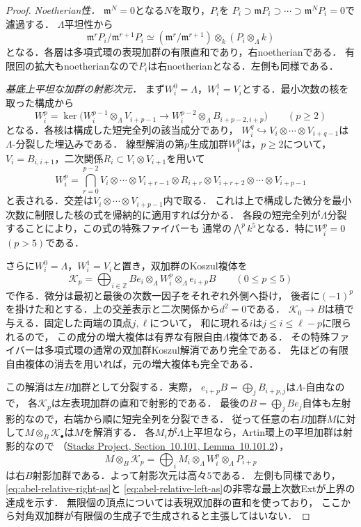 \begin{proof}
\emph{Noetherian性．}
$\mathfrak m^N=0$となる$N$を取り，$P_i$を
$P_i\supset\mathfrak mP_i\supset\cdots\supset\mathfrak m^NP_i=0$で濾過する．
$\Lambda$平坦性から
\[
 \mathfrak m^rP_i/\mathfrak m^{r+1}P_i
  \simeq (\mathfrak m^r/\mathfrak m^{r+1})
       \otimes_k(P_i\otimes_\Lambda k)
\]
となる．各層は多項式環の表現加群の有限直和であり，右noetherianである．
有限回の拡大もnoetherianなので$P_i$は右noetherianとなる．左側も同様である．

\emph{基底上平坦な加群の射影次元．}
まず$W_i^0=\Lambda$，$W_i^1=V_i$とする．最小次数の核を取った構成から
\[
 W_i^p=\ker\bigl(W_i^{p-1}\otimes_\Lambda V_{i+p-1}
       \longrightarrow W_i^{p-2}\otimes_\Lambda B_{i+p-2,i+p}\bigr)
 \qquad(p\geq2)
\]
となる．各核は構成した短完全列の該当成分であり，
$W_i^q\hookrightarrow V_i\otimes\cdots\otimes V_{i+q-1}$は
$\Lambda$-分裂した埋込みである．
線型解消の第$p$生成加群$W_i^p$は，$p\geq2$について，
$V_i=B_{i,i+1}$，二次関係$R_i\subset V_i\otimes V_{i+1}$を用いて
\[
 W_i^p
  =\bigcap_{r=0}^{p-2}
   V_i\otimes\cdots\otimes V_{i+r-1}
   \otimes R_{i+r}\otimes
   V_{i+r+2}\otimes\cdots\otimes V_{i+p-1}
\]
と表される．交差は$V_i\otimes\cdots\otimes V_{i+p-1}$内で取る．
これは上で構成した微分を最小次数に制限した核の式を帰納的に適用すれば分かる．
各段の短完全列が$\Lambda$分裂することにより，この式の特殊ファイバーも
通常の$\bigwedge^p k^5$となる．特に$W_i^p=0$ $(p>5)$である．

さらに$W_i^0=\Lambda$，$W_i^1=V_i$と置き，双加群のKoszul複体を
\[
 \mathcal K_p
  =\bigoplus_{i\in\mathbb Z}
    Be_i\otimes_\Lambda W_i^p\otimes_\Lambda e_{i+p}B
 \qquad(0\leq p\leq5)
\]
で作る．微分は最初と最後の次数一因子をそれぞれ外側へ掛け，
後者に$(-1)^p$を掛けた和とする．上の交差表示と二次関係から$d^2=0$である．
$\mathcal K_0\to B$は積で与える．固定した両端の頂点$j,\ell$について，
和に現れる$i$は$j\leq i\leq\ell-p$に限られるので，
この成分の増大複体は有界な有限自由$\Lambda$複体である．
その特殊ファイバーは多項式環の通常の双加群Koszul解消であり完全である．
先ほどの有限自由複体の消去を用いれば，元の増大複体も完全である．

この解消は左$B$加群として分裂する．実際，
$e_{i+p}B=\bigoplus_j B_{i+p,j}$は$\Lambda$-自由なので，
各$\mathcal K_p$は左表現加群の直和で射影的である．
最後の$B=\bigoplus_j Be_j$自体も左射影的なので，右端から順に短完全列を分裂できる．
従って任意の右$B$加群$M$に対して$M\otimes_B\mathcal K_\bullet$は$M$を解消する．
各$M_i$が$\Lambda$上平坦なら，Artin環上の平坦加群は射影的なので
（\href{https://stacks.math.columbia.edu/tag/051E}{Stacks Project,
Section~10.101, Lemma~10.101.2}），
\[
 M\otimes_B\mathcal K_p
  =\bigoplus_i M_i\otimes_\Lambda W_i^p\otimes_\Lambda P_{i+p}
\]
は右$B$射影加群である．よって射影次元は高々$5$である．
左側も同様であり，\eqref{eq:abel-relative-right-as}と
\eqref{eq:abel-relative-left-as}の非零な最上次数Extが上界の達成を示す．
無限個の頂点については表現双加群の直和を使っており，
ここから対角双加群が有限個の生成子で生成されると主張してはいない．
\end{proof}


